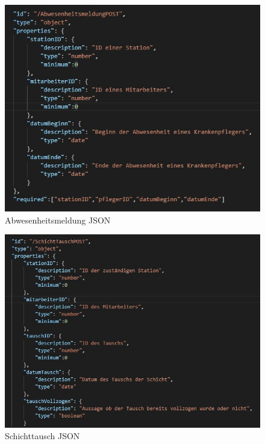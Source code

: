 \documentclass[11pt,
paper=a4,
bibtotocnumbered,	  %
liststotocnumbered,  %
DIV=calc,		  %
tablecaptionabove,	  %
headinclude,
]{article}
\begin{document}
\begin{figure}[H]
\includegraphics[width=1\textwidth]{Bilder/validAbwesenheiten.jpg}
\caption{Abwesenheitsmeldung JSON}
\end{figure}
\begin{figure}[H]
\includegraphics[width=1\textwidth]{Bilder/validSchichttausch.jpg}
\caption{Schichttausch JSON}
\end{figure}
\end{document}

